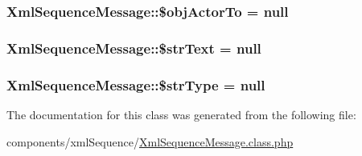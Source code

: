 \hypertarget{class_xml_sequence_message_6e35efb1112d87db5a90f660f2c7e487}{
\subsubsection[{\$objActorTo}]{\setlength{\rightskip}{0pt plus 5cm}XmlSequenceMessage::\$objActorTo = null}}
\label{class_xml_sequence_message_6e35efb1112d87db5a90f660f2c7e487}


\hypertarget{class_xml_sequence_message_5191806ce342246e9febbb7188ef914f}{
\subsubsection[{\$strText}]{\setlength{\rightskip}{0pt plus 5cm}XmlSequenceMessage::\$strText = null}}
\label{class_xml_sequence_message_5191806ce342246e9febbb7188ef914f}


\hypertarget{class_xml_sequence_message_9cbf41c891bfaaacc0048ec4e7f54765}{
\subsubsection[{\$strType}]{\setlength{\rightskip}{0pt plus 5cm}XmlSequenceMessage::\$strType = null}}
\label{class_xml_sequence_message_9cbf41c891bfaaacc0048ec4e7f54765}




The documentation for this class was generated from the following file:\begin{CompactItemize}
\item 
components/xmlSequence/\hyperlink{_xml_sequence_message_8class_8php}{XmlSequenceMessage.class.php}\end{CompactItemize}

